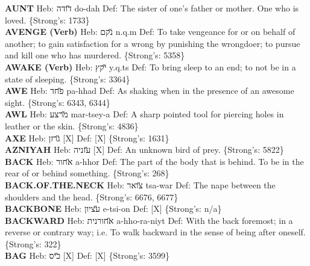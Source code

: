 {\textbf{AUNT} Heb: {\large\H דודה} do-dah Def: The sister of one's father or mother. One who is loved. \{Strong's: 1733\}\hfill{}\\

\textbf{AVENGE (Verb)} Heb: {\large\H נקם} n.q.m Def: To take vengeance for or on behalf of another; to gain satisfaction for a wrong by punishing the wrongdoer; to pursue and kill one who has murdered. \{Strong's: 5358\}\hfill{}\\

\textbf{AWAKE (Verb)} Heb: {\large\H יקץ} y.q.ts Def: To bring sleep to an end; to not be in a state of sleeping. \{Strong's: 3364\}\hfill{}\\

\textbf{AWE} Heb: {\large\H פחד} pa-hhad Def: As shaking when in the presence of an awesome sight. \{Strong's: 6343, 6344\}\hfill{}\\

\textbf{AWL} Heb: {\large\H מרצע} mar-tsey-a Def: A sharp pointed tool for piercing holes in leather or the skin. \{Strong's: 4836\}\hfill{}\\

\textbf{AXE} Heb: {\large\H גרזן} {[}X{]} Def: {[}X{]} \{Strong's: 1631\}\hfill{}\\

\textbf{AZNIYAH} Heb: {\large\H עזניה} {[}X{]} Def: An unknown bird of prey. \{Strong's: 5822\}\hfill{}\\

\textbf{BACK} Heb: {\large\H אחור} a-hhor Def: The part of the body that is behind. To be in the rear of or behind something. \{Strong's: 268\}\hfill{}\\

\textbf{BACK.OF.THE.NECK} Heb: {\large\H צואר} tsa-war Def: The nape between the shoulders and the head. \{Strong's: 6676, 6677\}\hfill{}\\

\textbf{BACKBONE} Heb: {\large\H עציון} e-tsi-on Def: {[}X{]} \{Strong's: n/a\}\hfill{}\\

\textbf{BACKWARD} Heb: {\large\H אחורנית} a-hho-ra-niyt Def: With the back foremost; in a reverse or contrary way; i.e. To walk backward in the sense of being after oneself. \{Strong's: 322\}\hfill{}\\

\textbf{BAG} Heb: {\large\H כיס} {[}X{]} Def: {[}X{]} \{Strong's: 3599\}\hfill{}\\

}
